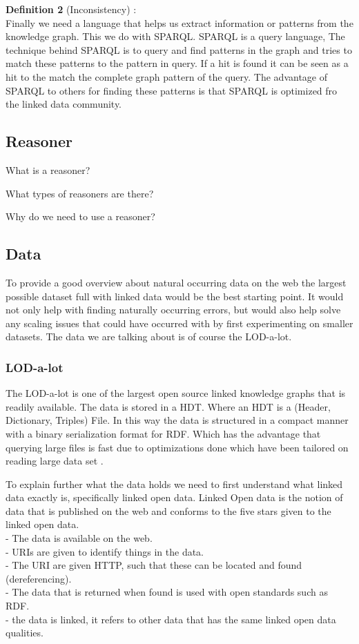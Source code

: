 \documentclass{article}
\begin{document}
\textbf{Definition 2} (Inconsistency) :\\

Finally we need a language that helps us extract information or patterns from the knowledge graph. This we do with SPARQL.
SPARQL is a query language, The technique behind SPARQL is to query and find patterns in the graph and tries to match these patterns to the pattern in query. If a hit is found it can be seen as a hit to the match the complete graph pattern of the query. The advantage of SPARQL to others for finding these patterns is that SPARQL is optimized fro the linked data community.  \cite{SPARQLPrimer:2013}

\subsection{Reasoner}
What is a reasoner?

What types of reasoners are there?

Why do we need to use a reasoner?


\subsection{Data}
To provide a good overview about natural occurring data on the web the largest possible dataset full with linked data would be the best starting point. It would not only help with finding naturally occurring errors, but would also help solve any scaling issues that could have occurred with by first experimenting on smaller datasets. The data we are talking about is of course the LOD-a-lot.

\subsubsection{LOD-a-lot}
The LOD-a-lot \cite{JavierD:2017} is one of the largest open source linked knowledge graphs that is readily available. The data is stored in a HDT. Where an HDT is a (Header, Dictionary, Triples) File. In this way the data is structured in a compact manner with a binary serialization format for RDF. Which has the advantage that querying large files is fast due to optimizations done which have been tailored on reading large data set \cite{JavierD:2013}.

To explain further what the data holds we need to first understand what linked data exactly is, specifically linked open data. Linked Open data is the notion of data that is published on the web and conforms to the five stars given to the linked open data. \cite{ChristianB:2009}\\
 - The data is available on the web.\\
 - URIs are given to identify things in the data.\\
 - The URI are given HTTP, such that these can be located and found (dereferencing).\\
 - The data that is returned when found is used with open standards such as RDF.\\
 - the data is linked, it refers to other data that has the same linked open data qualities.\\
 
\end{document}
